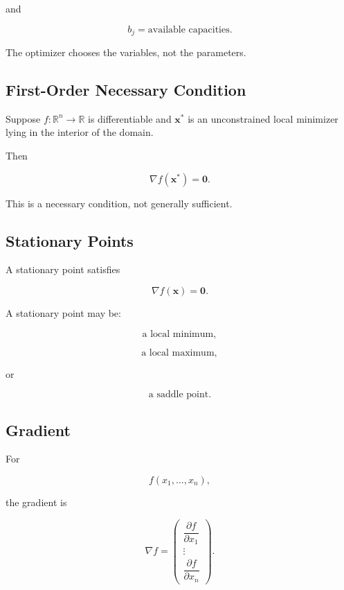 and

\[
\boxed{
b_j
=
\text{available capacities}.
}
\]

The optimizer chooses the variables, not the parameters.

\subsection{First-Order Necessary Condition}
\label{subsec:first-order-necessary-condition}

Suppose \(f:\mathbb{R}^n\to\mathbb{R}\) is differentiable and
\(\mathbf{x}^*\) is an unconstrained local minimizer lying in the
interior of the domain.

Then

\[
\boxed{
\nabla f(\mathbf{x}^*)
=
\mathbf{0}.
}
\]

This is a necessary condition, not generally sufficient.

\subsection{Stationary Points}
\label{subsec:stationary-points-optimization}

A stationary point satisfies

\[
\boxed{
\nabla f(\mathbf{x})=\mathbf{0}.
}
\]

A stationary point may be:

\[
\boxed{
\text{a local minimum},
}
\]

\[
\boxed{
\text{a local maximum},
}
\]

or

\[
\boxed{
\text{a saddle point}.
}
\]

\subsection{Gradient}
\label{subsec:optimization-gradient}

For

\[
f(x_1,\ldots,x_n),
\]

the gradient is

\[
\boxed{
\nabla f
=
\begin{pmatrix}
\dfrac{\partial f}{\partial x_1}
\\[0.5em]
\vdots
\\[0.5em]
\dfrac{\partial f}{\partial x_n}
\end{pmatrix}.
}
\]

